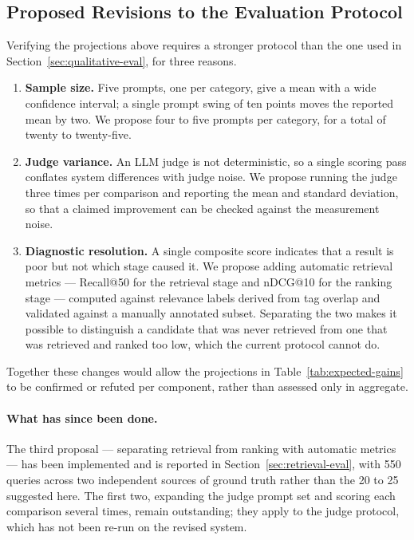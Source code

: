 \subsection{Proposed Revisions to the Evaluation Protocol}
\label{sec:eval-protocol-revision}

Verifying the projections above requires a stronger protocol than the one used
in Section~\ref{sec:qualitative-eval}, for three reasons.

\begin{enumerate}
  \item \textbf{Sample size.} Five prompts, one per category, give a mean with a
  wide confidence interval; a single prompt swing of ten points moves the
  reported mean by two. We propose four to five prompts per category, for a
  total of twenty to twenty-five.

  \item \textbf{Judge variance.} An LLM judge is not deterministic, so a single
  scoring pass conflates system differences with judge noise. We propose running
  the judge three times per comparison and reporting the mean and standard
  deviation, so that a claimed improvement can be checked against the
  measurement noise.

  \item \textbf{Diagnostic resolution.} A single composite score indicates that
  a result is poor but not which stage caused it. We propose adding automatic
  retrieval metrics --- Recall@50 for the retrieval stage and nDCG@10 for the
  ranking stage --- computed against relevance labels derived from tag overlap
  and validated against a manually annotated subset. Separating the two makes it
  possible to distinguish a candidate that was never retrieved from one that was
  retrieved and ranked too low, which the current protocol cannot do.
\end{enumerate}

Together these changes would allow the projections in
Table~\ref{tab:expected-gains} to be confirmed or refuted per component, rather
than assessed only in aggregate.

\paragraph{What has since been done.}
The third proposal --- separating retrieval from ranking with automatic metrics
--- has been implemented and is reported in Section~\ref{sec:retrieval-eval},
with 550 queries across two independent sources of ground truth rather than the
20 to 25 suggested here. The first two, expanding the judge prompt set and
scoring each comparison several times, remain outstanding; they apply to the
judge protocol, which has not been re-run on the revised system.
